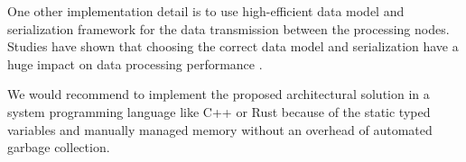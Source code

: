 One other implementation detail is to use high-efficient data model and serialization framework for the data transmission between 
the processing nodes. Studies have shown that choosing the correct data model and serialization  have a huge impact on data 
processing performance \cite{DBLP:conf/cloud/SikdarTJ17}. 

We would recommend to implement the proposed architectural solution in a system programming language like C++ or Rust because of the static 
typed variables and manually managed memory without an overhead of automated garbage collection. 


